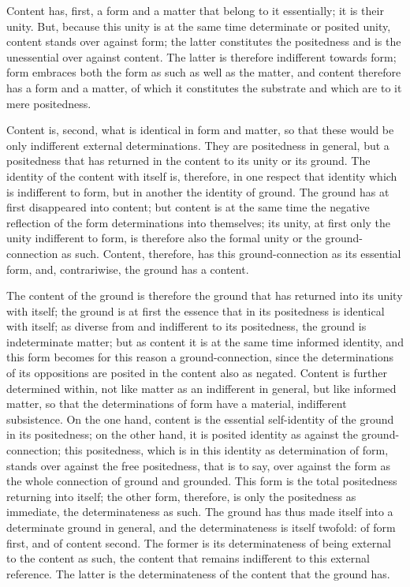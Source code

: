 Content has, first, a form and a matter that
belong to it essentially; it is their unity.
But, because this unity is at the same time determinate
or posited unity, content stands over against form;
the latter constitutes the positedness
and is the unessential over against content.
The latter is therefore indifferent towards form;
form embraces both the form as such as well as the matter,
and content therefore has a form and a matter,
of which it constitutes the substrate
and which are to it mere positedness.

Content is, second, what is identical in form and matter,
so that these would be only indifferent external determinations.
They are positedness in general, but a positedness
that has returned in the content to its unity or its ground.
The identity of the content with itself is,
therefore, in one respect that identity which is indifferent to form,
but in another the identity of ground.
The ground has at first disappeared into content;
but content is at the same time the negative reflection of
the form determinations into themselves;
its unity, at first only the unity indifferent to form, is
therefore also the formal unity or the ground-connection as such.
Content, therefore, has this ground-connection as its essential form,
and, contrariwise, the ground has a content.

The content of the ground is therefore the ground
that has returned into its unity with itself;
the ground is at first the essence that in its
positedness is identical with itself;
as diverse from and indifferent to its positedness,
the ground is indeterminate matter;
but as content it is at the same time informed identity,
and this form becomes for this reason a ground-connection,
since the determinations of its oppositions are posited
in the content also as negated.
Content is further determined within,
not like matter as an indifferent in general,
but like informed matter,
so that the determinations of form have
a material, indifferent subsistence.
On the one hand, content is the essential self-identity
of the ground in its positedness;
on the other hand, it is posited identity
as against the ground-connection;
this positedness, which is in this identity as determination of form,
stands over against the free positedness, that is to say,
over against the form as the whole connection of ground and grounded.
This form is the total positedness returning into itself;
the other form, therefore, is only the positedness as immediate,
the determinateness as such.
The ground has thus made itself into a determinate ground in general,
and the determinateness is itself twofold:
of form first, and of content second.
The former is its determinateness of being external to the content as such,
the content that remains indifferent to this external reference.
The latter is the determinateness of the content that the ground has.

